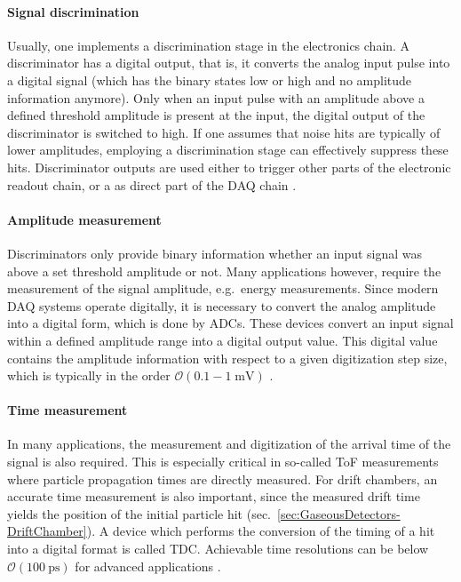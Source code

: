 \paragraph{Signal discrimination}
Usually, one implements a discrimination stage in the electronics chain. A discriminator has a digital output, that is, it converts the analog input pulse into a digital signal (which has the binary states low or high and no amplitude information anymore). Only when an input pulse with an amplitude above a defined threshold amplitude is present at the input, the digital output of the discriminator is switched to high. If one assumes that noise hits are typically of lower amplitudes, employing a discrimination stage can effectively suppress these hits. Discriminator outputs are used either to trigger other parts of the electronic readout chain, or a as direct part of the \ac{DAQ} chain \cite{Book-KolanoskiWermes}.
\paragraph{Amplitude measurement}
Discriminators only provide binary information whether an input signal was above a set threshold amplitude or not. Many applications however, require the measurement of the signal amplitude, e.g.\ energy measurements. Since modern \ac{DAQ} systems operate digitally, it is necessary to convert the analog amplitude into a digital form, which is done by \acfp{ADC}. These devices convert an input signal within a defined amplitude range into a digital output value. This digital value contains the amplitude information with respect to a given digitization step size, which is typically in the order $\mathcal{O}(0.1-1\;\si{\milli\volt})$ \cite{Book-KolanoskiWermes}.
\paragraph{Time measurement}
In many applications, the measurement and digitization of the arrival time of the signal is also required. This is especially critical in so-called \ac{ToF} measurements where particle propagation times are directly measured. For drift chambers, an accurate time measurement is also important, since the measured drift time yields the position of the initial particle hit (sec.\ \ref{sec:GaseousDetectors-DriftChamber}). A device which performs the conversion of the timing of a hit into a digital format is called \acf{TDC}. Achievable time resolutions can be below $\mathcal{O}(\SI{100}{\pico\second})$ for advanced applications \cite{Book-KolanoskiWermes}.
